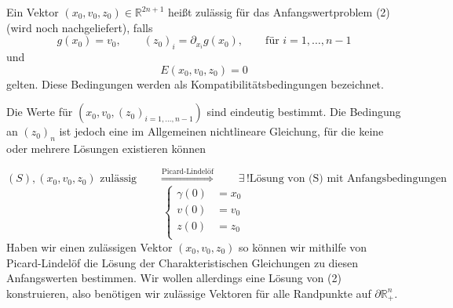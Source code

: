 \begin{definition*}
	Ein Vektor $(x_0,v_0,z_0) \in \mathbb{R}^{2n+1}$ heißt zulässig für das Anfangswertproblem (2) (wird noch nachgeliefert), falls \[
		g(x_0)=v_0, \qquad (z_0)_i = \partial_{x_i}g(x_0), \qquad \text{für }i=1,\dots,n-1
	\]
	und
	\[
		E(x_0,v_0,z_0) = 0
	\]
	gelten. Diese Bedingungen werden als Kompatibilitätsbedingungen bezeichnet.
\end{definition*}

\begin{bemerkung}
	Die Werte für $(x_0,v_0,(z_0)_{i=1,\dots,n-1})$ sind eindeutig bestimmt. Die Bedingung an $(z_0)_n$ ist jedoch eine im Allgemeinen nichtlineare Gleichung, für die
	keine oder mehrere Lösungen existieren können
\end{bemerkung}
\[
	(S), (x_0,v_0,z_0) \text{ zulässig} \qquad \stackrel{\text{Picard-Lindelöf}}{\Rightarrow } \qquad \exists\,! \text{Lösung von (S) mit Anfangsbedingungen }\]
	\[
		\begin{cases}
				\gamma(0)&= x_0\\
				v(0)&=v_0 \\
				z(0)&=z_0 \\
		\end{cases}
	\]
Haben wir einen zulässigen Vektor $(x_0,v_0,z_0)$ so können wir mithilfe von Picard-Lindelöf die Lösung der Charakteristischen Gleichungen zu diesen Anfangswerten bestimmen. Wir wollen allerdings eine Lösung von (2) konstruieren, also benötigen wir zulässige Vektoren für alle Randpunkte auf $\partial \mathbb{R}^n_+$.

